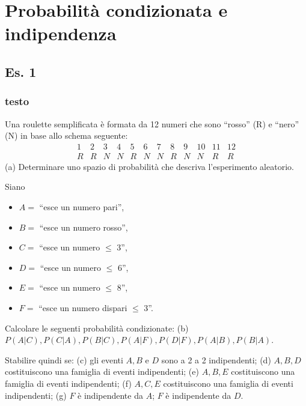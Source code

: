 \section{Probabilità condizionata e indipendenza}
\subsection{Es. 1}
\subsubsection{testo}
Una roulette semplificata è formata da 12 numeri che sono “rosso” (R) e “nero” (N) in base allo schema seguente:
\[
\begin{array}{cccccccccccc}
1 & 2 & 3 & 4 & 5 & 6 & 7 & 8 & 9 & 10 & 11 & 12 \\
R & R & N & N & R & N & N & R & N & N & R & R
\end{array}
\]
(a) Determinare uno spazio di probabilità che descriva l’esperimento aleatorio.

Siano
\begin{itemize}
    \item \( A = \) “esce un numero pari”,
    \item \( B = \) “esce un numero rosso”,
    \item \( C = \) “esce un numero $\leq$ 3”,
    \item \( D = \) “esce un numero $\leq$ 6”,
    \item \( E = \) “esce un numero $\leq$ 8”,
    \item \( F = \) “esce un numero dispari $\leq$ 3”.
\end{itemize}

Calcolare le seguenti probabilità condizionate:
(b) \( P(A|C), P(C|A), P(B|C), P(A|F), P(D|F), P(A|B), P(B|A) \).

Stabilire quindi se:
(c) gli eventi \( A, B \) e \( D \) sono a 2 a 2 indipendenti;
(d) \( A, B, D \) costituiscono una famiglia di eventi indipendenti;
(e) \( A, B, E \) costituiscono una famiglia di eventi indipendenti;
(f) \( A, C, E \) costituiscono una famiglia di eventi indipendenti;
(g) \( F \) è indipendente da \( A \); \( F \) è indipendente da \( D \).


